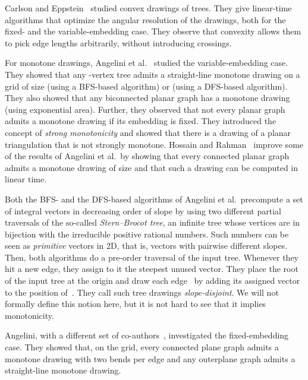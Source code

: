 \documentclass[a4paper,11pt]{article}
\theoremstyle{plain}
\begin{document}
Carlson and Eppstein~\cite{ce-tcfoa-GD06} studied convex drawings of
trees.  They give linear-time algorithms that optimize the angular
resolution of the drawings, both for the fixed- and the
variable-embedding case.  They observe that convexity allows them to
pick edge lengths arbitrarily, without introducing crossings.

For monotone drawings, Angelini et al.~\cite{acbfp-mdg-12} studied the
variable-embed\-ding case.  They showed that any -vertex tree admits
a straight-line monotone drawing on a grid of size  (using a BFS-based algorithm) or 
(using a DFS-based algorithm).  They also showed that any biconnected
planar graph has a monotone drawing (using exponential area).
Further, they observed that not every planar graph admits a monotone
drawing if its embedding is fixed.  They introduced the concept of
\emph{strong monotonicity} and showed that there is a drawing of a
planar triangulation that is not strongly monotone.  Hossain and
Rahman~\cite{hr-mgdpg-FAW14} improve some of the results of Angelini
et al.\ by showing that every connected planar graph
admits a monotone drawing of size  and that such a
drawing can be computed in linear time. 

Both the BFS- and the DFS-based algorithms of Angelini et al.\
precompute a set of  integral vectors in decreasing order 
of slope by using two different partial traversals of the
so-called \emph{Stern--Brocot tree}, an infinite tree whose vertices are in
bijection with the irreducible positive rational numbers.  Such
numbers can be seen as \emph{primitive} vectors in 2D, that is,
vectors with pairwise different slopes.  Then, both algorithms do a
pre-order traversal of the input tree.  Whenever they
hit a new edge, they assign to it the steepest unused vector.  They
place the root of the input tree at the origin and draw each
edge~ by adding its assigned vector to the position
of~.  They call such tree drawings \emph{slope-disjoint}.  We will not
formally define this notion here, but it is not hard to see that it
implies monotonicity.  

Angelini, with a different set of co-authors~\cite{adkmrsw-mdgfe-A15},
investigated the fixed-embedding case.  They showed that, on the
 grid, every connected plane graph admits a
monotone drawing with two bends per edge and any outerplane graph
admits a straight-line monotone drawing.
\end{document}
